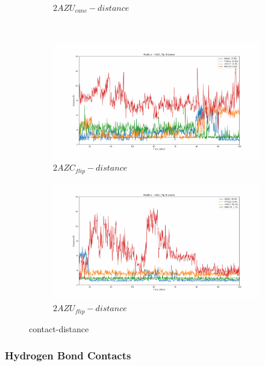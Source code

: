 \documentclass[fleqn,10pt]{wlscirep}
\begin{document}
\begin{figure}[!ht]
\begin{subfigure}{.45\textwidth}
     \caption{$2AZU_{canc}-distance$}
     \label{fig:2AZU_canc-dist}
   \end{subfigure}
   \\
   \begin{subfigure}{.45\textwidth}
     \centering
     \includegraphics[width=.95\linewidth]{2AZC_flip/2AZC_flip-dist_3.pdf}
     \caption{$2AZC_{flip}-distance$}
     \label{fig:2AZC_flip-dist}
   \end{subfigure}
    \begin{subfigure}{.45\textwidth}
     \centering
     \includegraphics[width=.95\linewidth]{2AZU_flip/2AZU_flip-dist_4.pdf}
     \caption{$2AZU_{flip}-distance$}
     \label{fig:2AZU_flip-dist}
   \end{subfigure}
\caption{contact-distance}
\label{fig:contact-distance}
\end{figure}  

\subsubsection{Hydrogen Bond Contacts}
\end{document}
